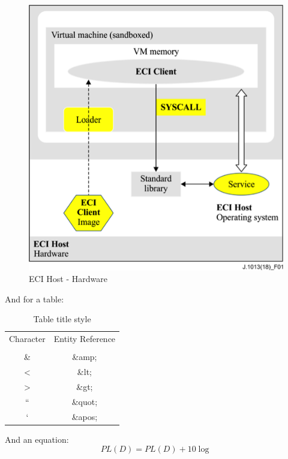 \documentclass[10pt,a4paper,twocolumn]{article}
\begin{document}
\begin{figure}
	\includegraphics[width=\columnwidth]{Figure1}
	\caption{ECI Host - Hardware}
	\label{fig:fig1} 
\end{figure}


And for a table:
\begin{table}
	\centering
	\caption{Table title style}\label{tab:tab1} 
	\begin{small}
	\begin{tabular}{|c|c|}
		\hline
		Character & Entity Reference\\ 
		& \\
		\hline
		\hline
		\& & \&amp; \\
		\hline
		< & \&lt;\\
		\hline
		> & \&gt; \\
		\hline
		``  & \&quot; \\
		\hline
		` & \&apos; \\
		\hline
	\end{tabular}
	\end{small}
\end{table}


And an equation:
\begin{equation}\label{eq:eq1}
	PL(D)=PL(D)+10\log 
\end{equation}
\end{document}
